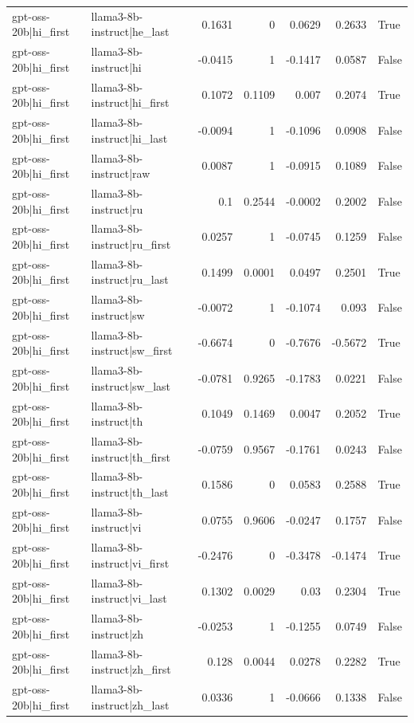 \begin{table}
\begin{tabular}{l l r r r r l}
gpt-oss-20b|hi_first & llama3-8b-instruct|he_last & 0.1631 & 0 & 0.0629 & 0.2633 & True \\
gpt-oss-20b|hi_first & llama3-8b-instruct|hi & -0.0415 & 1 & -0.1417 & 0.0587 & False \\
gpt-oss-20b|hi_first & llama3-8b-instruct|hi_first & 0.1072 & 0.1109 & 0.007 & 0.2074 & True \\
gpt-oss-20b|hi_first & llama3-8b-instruct|hi_last & -0.0094 & 1 & -0.1096 & 0.0908 & False \\
gpt-oss-20b|hi_first & llama3-8b-instruct|raw & 0.0087 & 1 & -0.0915 & 0.1089 & False \\
gpt-oss-20b|hi_first & llama3-8b-instruct|ru & 0.1 & 0.2544 & -0.0002 & 0.2002 & False \\
gpt-oss-20b|hi_first & llama3-8b-instruct|ru_first & 0.0257 & 1 & -0.0745 & 0.1259 & False \\
gpt-oss-20b|hi_first & llama3-8b-instruct|ru_last & 0.1499 & 0.0001 & 0.0497 & 0.2501 & True \\
gpt-oss-20b|hi_first & llama3-8b-instruct|sw & -0.0072 & 1 & -0.1074 & 0.093 & False \\
gpt-oss-20b|hi_first & llama3-8b-instruct|sw_first & -0.6674 & 0 & -0.7676 & -0.5672 & True \\
gpt-oss-20b|hi_first & llama3-8b-instruct|sw_last & -0.0781 & 0.9265 & -0.1783 & 0.0221 & False \\
gpt-oss-20b|hi_first & llama3-8b-instruct|th & 0.1049 & 0.1469 & 0.0047 & 0.2052 & True \\
gpt-oss-20b|hi_first & llama3-8b-instruct|th_first & -0.0759 & 0.9567 & -0.1761 & 0.0243 & False \\
gpt-oss-20b|hi_first & llama3-8b-instruct|th_last & 0.1586 & 0 & 0.0583 & 0.2588 & True \\
gpt-oss-20b|hi_first & llama3-8b-instruct|vi & 0.0755 & 0.9606 & -0.0247 & 0.1757 & False \\
gpt-oss-20b|hi_first & llama3-8b-instruct|vi_first & -0.2476 & 0 & -0.3478 & -0.1474 & True \\
gpt-oss-20b|hi_first & llama3-8b-instruct|vi_last & 0.1302 & 0.0029 & 0.03 & 0.2304 & True \\
gpt-oss-20b|hi_first & llama3-8b-instruct|zh & -0.0253 & 1 & -0.1255 & 0.0749 & False \\
gpt-oss-20b|hi_first & llama3-8b-instruct|zh_first & 0.128 & 0.0044 & 0.0278 & 0.2282 & True \\
gpt-oss-20b|hi_first & llama3-8b-instruct|zh_last & 0.0336 & 1 & -0.0666 & 0.1338 & False \\

\end{tabular}
\end{table}
